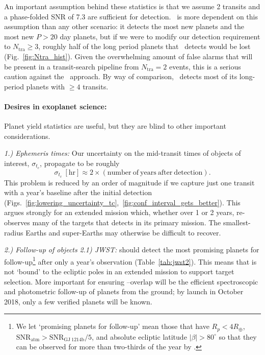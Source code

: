 An important assumption behind these statistics is that we assume 2 transits and a phase-folded SNR of 7.3 are sufficient for detection.
\hemis\ is more dependent on this assumption than any other scenario: it detects the most new planets and the most new $P>20$ day planets, but if we were to modify our detection requirement to $N_\mathrm{tra}\geq 3$, roughly half of the long period planets that \hemis\ detects would be lost (Fig.~\ref{fig:Ntra_hist}).
Given the overwhelming amount of false alarms that will be present in a transit-search pipeline from $N_\mathrm{tra} = 2$ events, this is a serious caution against the \hemis\ approach.
By way of comparison, \npole\ detects most of its long-period planets with $\ge 4$ transits.





\paragraph{Desires in exoplanet science:}
Planet yield statistics are useful, but they are blind to other important considerations.

\textit{1.) Ephemeris times:} 
Our uncertainty on the mid-transit times of \tess objects of interest, $\sigma_{t_c}$, propagate to be roughly
$$\sigma_{t_c}\ \mathrm{[hr]} \approx 2\times\left(\mathrm{number\ of\ years\ after\ detection}\right). $$
This problem is reduced by an order of magnitude if we capture just one transit with a year's baseline after the initial detection (Figs.~\ref{fig:lowering_uncertainty_tc},~\ref{fig:conf_interval_gets_better}).
This argues strongly for an extended mission which, whether over 1 or 2 years, re-observes many of the targets that \tess detects in its primary mission. 
The smallest-radius Earths and super-Earths may otherwise be difficult to recover.

\textit{2.) Follow-up of \tess objects}\newline
\textit{2.1) JWST:} \tess should detect the most promising planets for \jwst follow-up\footnote{We let `promising planets for \jwst follow-up' mean those that have $R_p<4R_\oplus$, $\mathrm{SNR_{atm}} > \mathrm{SNR_{GJ\ 1214b}}/5$, and absolute ecliptic latitude $|\beta|>80^\circ$ so that they can be observed for more than two-thirds of the year by \jwst\!.} after only a year's observation (Table~\ref{tab:jwst2}).
This means that \tess is not `bound' to the ecliptic poles in an extended mission to support \jwsts target selection.
More important for ensuring \jwst\!--\tess overlap will be the efficient spectroscopic and photometric follow-up of \tesss planets from the ground; by \jwsts launch in October 2018, only a few verified \tess planets will be known.

